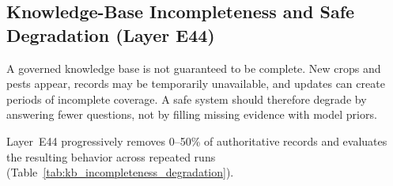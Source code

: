 \documentclass[a4paper,fleqn]{cas-dc}
\begin{document}
\subsection{Knowledge-Base Incompleteness and Safe Degradation (Layer E44)}

A governed knowledge base is not guaranteed to be complete. New crops and pests appear, records may be temporarily unavailable, and updates can create periods of incomplete coverage. A safe system should therefore degrade by answering fewer questions, not by filling missing evidence with model priors.

Layer~E44 progressively removes 0--50\% of authoritative records and evaluates the resulting behavior across repeated runs (Table~\ref{tab:kb_incompleteness_degradation}).


\begin{table}[t]
\centering\small
\caption{Knowledge-Base Incompleteness \& Monotone Safe Degradation (Layer~E44): System behavior under progressive evidence deletion (0\% to 50\% of official facts deleted). KrishokChat coverage gracefully declines while Critical Unsafe Acceptance Rate (CUAR) remains bounded near \textbf{0.0\%}, converting knowledge gaps into safe abstentions rather than hallucinations.}
\label{tab:kb_incompleteness_degradation}
\end{table}
\end{document}
